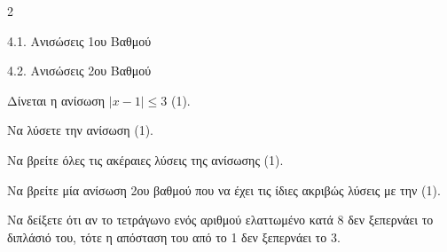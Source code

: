 \begin{ylh}{2}
    \item 4.1. Ανισώσεις 1ου Βαθμού
    \item 4.2. Ανισώσεις 2ου Βαθμού
\end{ylh}
Δίνεται η ανίσωση $|x - 1| \le 3$ (1).

\begin{alist}
\item Να λύσετε την ανίσωση (1).
\item Να βρείτε όλες τις ακέραιες λύσεις της ανίσωσης (1).
\item Να βρείτε μία ανίσωση 2ου βαθμού που να έχει τις ίδιες ακριβώς λύσεις με την (1).
\item Να δείξετε ότι αν το τετράγωνο ενός αριθμού ελαττωμένο κατά 8 δεν ξεπερνάει το διπλάσιό του, τότε η απόσταση του από το 1 δεν ξεπερνάει το 3.
\end{alist}

